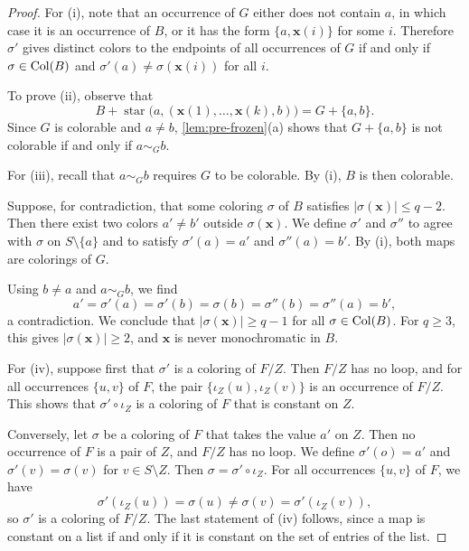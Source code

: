 \begin{proof}
For (i), note that an occurrence of $G$ either does not contain $a$, in which case it is an occurrence of $B$, or it has the form $\{a, \mathbf x(i)\}$ for some $i$. Therefore $\sigma'$ gives distinct colors to the endpoints of all occurrences of $G$ if and only if $\sigma \in \operatorname{Col}(B)$ and $\sigma'(a) \ne \sigma(\mathbf x(i))$ for all $i$.

To prove (ii), observe that
\begin{equation*}
B + \operatorname{star}\bigl(a, (\mathbf x(1), \dots, \mathbf x(k), b)\bigr) = G + \{a, b\}.
\end{equation*}
Since $G$ is colorable and $a \ne b$, \cref{lem:pre-frozen}(a) shows that $G + \{a, b\}$ is not colorable if and only if $a \sim_G b$.

For (iii), recall that $a \sim_G b$ requires $G$ to be colorable. By (i), $B$ is then colorable.

Suppose, for contradiction, that some coloring $\sigma$ of $B$ satisfies $|\sigma(\mathbf x)| \le q - 2$. Then there exist two colors $a' \ne b'$ outside $\sigma(\mathbf x)$. We define $\sigma'$ and $\sigma''$ to agree with $\sigma$ on $S \setminus \{a\}$ and to satisfy $\sigma'(a) = a'$ and $\sigma''(a) = b'$. By (i), both maps are colorings of $G$.

Using $b \ne a$ and $a \sim_G b$, we find
\begin{equation*}
a' = \sigma'(a) = \sigma'(b) = \sigma(b) = \sigma''(b) = \sigma''(a) = b',
\end{equation*}
a contradiction. We conclude that $|\sigma(\mathbf x)| \ge q - 1$ for all $\sigma \in \operatorname{Col}(B)$. For $q \ge 3$, this gives $|\sigma(\mathbf x)| \ge 2$, and $\mathbf x$ is never monochromatic in $B$.

For (iv), suppose first that $\sigma'$ is a coloring of $F/Z$. Then $F/Z$ has no loop, and for all occurrences $\{u, v\}$ of $F$, the pair $\{\iota_Z(u), \iota_Z(v)\}$ is an occurrence of $F/Z$. This shows that $\sigma' \circ \iota_Z$ is a coloring of $F$ that is constant on $Z$.

Conversely, let $\sigma$ be a coloring of $F$ that takes the value $a'$ on $Z$. Then no occurrence of $F$ is a pair of $Z$, and $F/Z$ has no loop. We define $\sigma'(o) = a'$ and $\sigma'(v) = \sigma(v)$ for $v \in S \setminus Z$. Then $\sigma = \sigma'\circ\iota_Z$. For all occurrences $\{u, v\}$ of $F$, we have
\begin{equation*}
\sigma'(\iota_Z(u)) = \sigma(u) \ne \sigma(v) = \sigma'(\iota_Z(v)),
\end{equation*}
so $\sigma'$ is a coloring of $F/Z$. The last statement of (iv) follows, since a map is constant on a list if and only if it is constant on the set of entries of the list.
\end{proof}

